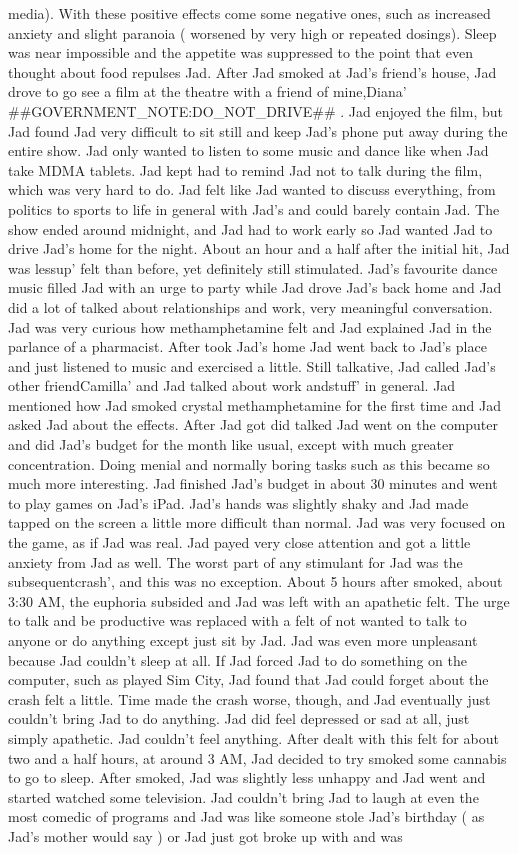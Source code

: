 \documentclass[12pt]{book}
\begin{document}
media). With these positive effects come some negative ones, such as increased anxiety and slight paranoia ( worsened by very high or repeated dosings). Sleep was near impossible and the appetite was suppressed to the point that even thought about food repulses Jad. After Jad smoked at Jad's friend's house, Jad drove to go see a film at the theatre with a friend of mine,Diana' \#\#GOVERNMENT\_NOTE:DO\_NOT\_DRIVE\#\# . Jad enjoyed the film, but Jad found Jad very difficult to sit still and keep Jad's phone put away during the entire show. Jad only wanted to listen to some music and dance like when Jad take MDMA tablets. Jad kept had to remind Jad not to talk during the film, which was very hard to do. Jad felt like Jad wanted to discuss everything, from politics to sports to life in general with Jad's and could barely contain Jad. The show ended around midnight, and Jad had to work early so Jad wanted Jad to drive Jad's home for the night. About an hour and a half after the initial hit, Jad was lessup' felt than before, yet definitely still stimulated. Jad's favourite dance music filled Jad with an urge to party while Jad drove Jad's back home and Jad did a lot of talked about relationships and work, very meaningful conversation. Jad was very curious how methamphetamine felt and Jad explained Jad in the parlance of a pharmacist. After took Jad's home Jad went back to Jad's place and just listened to music and exercised a little. Still talkative, Jad called Jad's other friendCamilla' and Jad talked about work andstuff' in general. Jad mentioned how Jad smoked crystal methamphetamine for the first time and Jad asked Jad about the effects. After Jad got did talked Jad went on the computer and did Jad's budget for the month like usual, except with much greater concentration. Doing menial and normally boring tasks such as this became so much more interesting. Jad finished Jad's budget in about 30 minutes and went to play games on Jad's iPad. Jad's hands was slightly shaky and Jad made tapped on the screen a little more difficult than normal. Jad was very focused on the game, as if Jad was real. Jad payed very close attention and got a little anxiety from Jad as well. The worst part of any stimulant for Jad was the subsequentcrash', and this was no exception. About 5 hours after smoked, about 3:30 AM, the euphoria subsided and Jad was left with an apathetic felt. The urge to talk and be productive was replaced with a felt of not wanted to talk to anyone or do anything except just sit by Jad. Jad was even more unpleasant because Jad couldn't sleep at all. If Jad forced Jad to do something on the computer, such as played Sim City, Jad found that Jad could forget about the crash felt a little. Time made the crash worse, though, and Jad eventually just couldn't bring Jad to do anything. Jad did feel depressed or sad at all, just simply apathetic. Jad couldn't feel anything. After dealt with this felt for about two and a half hours, at around 3 AM, Jad decided to try smoked some cannabis to go to sleep. After smoked, Jad was slightly less unhappy and Jad went and started watched some television. Jad couldn't bring Jad to laugh at even the most comedic of programs and Jad was like someone stole Jad's birthday ( as Jad's mother would say ) or Jad just got broke up with and was 
\end{document}
